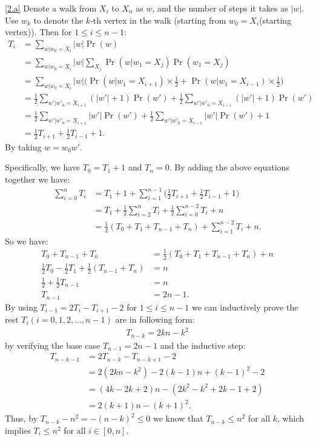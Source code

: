 \documentclass{homework}
\begin{document}
\begin{solution}
\ref{2.a}
Denote a walk from $X_i$ to $X_n$ as $w$, and the number of steps it takes as $|w|$. Use $w_k$ to denote the $k$-th vertex in the walk (starting from $w_0 = X_i$(starting vertex)). Then for $1\le i\le n-1$:
\begin{align*}
  T_i &= \sum_{w|w_0=X_i}|w|\Pr(w)\\
  &= \sum_{w|w_0=X_i}|w|\sum_{X_j}\Pr(w|w_1=X_j)\Pr(w_1=X_j)\\
  &= \sum_{w|w_0=X_i}|w|\bigl(\Pr(w|w_1=X_{i+1})\times \frac{1}{2}+ \Pr(w|w_1=X_{i-1})\times \frac{1}{2}\bigr)\\
  &= \frac{1}{2}\sum_{w'|w'_0=X_{i+1}}(|w'|+1)\Pr(w') + \frac{1}{2}\sum_{w'|w'_0=X_{i-1}}(|w'|+1)\Pr(w')\\
  &= \frac{1}{2}\sum_{w'|w'_0=X_{i+1}}|w'|\Pr(w') + \frac{1}{2}\sum_{w'|w'_0=X_{i-1}}|w'|\Pr(w') + 1\\
  &= \frac{1}{2}T_{i+1} + \frac{1}{2}T_{i-1} + 1.
\end{align*}
By taking $w = w_0w'$.

Specifically, we have $T_0 = T_1+1$ and $T_n = 0$. By adding the above equations together we have:
\begin{align*}
  \sum_{i=0}^{n}T_i &= T_1 + 1 + \sum_{i=1}^{n-1}\bigl(\frac{1}{2}T_{i+1} + \frac{1}{2}T_{i-1} +1\bigr)\\
  &= T_1 +\frac{1}{2}\sum_{i=2}^n T_i + \frac{1}{2}\sum_{i=0}^{n-2} T_i + n\\
  &= \frac{1}{2}(T_0 + T_1 + T_{n-1} + T_n) + \sum_{i=1}^{n-2}T_i + n.
\end{align*}
So we have:
\begin{align*}
  T_0 + T_{n-1} + T_{n} &= \frac{1}{2}(T_0 + T_1 + T_{n-1} + T_n) + n\\
  \frac{1}{2}T_0-\frac{1}{2}T_1 + \frac{1}{2}(T_{n-1} + T_n) &= n\\
  \frac{1}{2} + \frac{1}{2}T_{n-1} &= n\\
  T_{n-1} &= 2n-1.
\end{align*}
By using $T_{i-1} = 2T_i - T_{i+1} - 2$ for $1\le i\le n-1$ we can inductively prove the rest $T_i (i=0,1,2,...,n-1)$ are in following form:
\begin{align*}
  T_{n-k} = 2kn - k^2
\end{align*}
by verifying the base case $T_{n-1} = 2n-1$ and the inductive step:
\begin{align*}
  T_{n-k-1} &= 2T_{n-k} - T_{n-k+1} - 2\\
  &= 2(2kn - k^2) - 2(k-1)n + (k-1)^2 - 2\\
  &= (4k - 2k + 2)n -(2k^2 - k^2 + 2k -1 +2)\\
  &= 2(k+1)n - (k+1)^2.
\end{align*}
Thus, by $T_{n-k} - n^2 = -(n-k)^2\le 0$ we know that $T_{n-k}\le n^2$ for all $k$, which implies $T_i\le n^2$ for all $i\in[0,n]$.


\end{solution}
\end{document}
